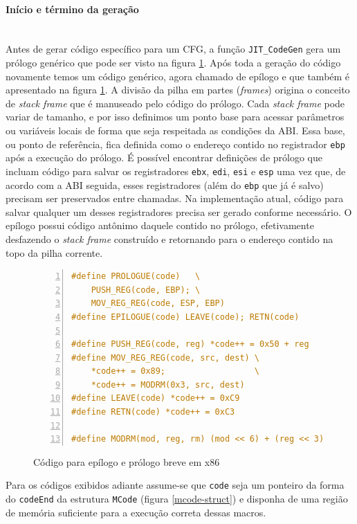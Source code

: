 \paragraph{Início e término da geração}
\quad \\
Antes de gerar código específico para um CFG, a função
\verb!JIT_CodeGen! gera um prólogo genérico que pode ser visto na
figura \ref{prologo-epilogo}. Após toda a geração do código novamente
temos um código genérico, agora chamado de epílogo e que também é
apresentado na figura \ref{prologo-epilogo}. A divisão da pilha em
partes (\textit{frames}) origina o conceito de \textit{stack frame}
que é manuseado pelo código do prólogo. Cada \textit{stack frame} pode
variar de tamanho, e por isso definimos um ponto base para acessar
parâmetros ou variáveis locais de forma que seja respeitada as
condições da ABI. Essa base, ou ponto de referência, fica definida como
o endereço contido no registrador \verb!ebp! após a execução do
prólogo. É possível encontrar definições de prólogo que incluam código
para salvar os registradores \verb!ebx!, \verb!edi!, \verb!esi!
e \verb!esp! uma vez que, de acordo com a ABI seguida, esses
registradores (além do \verb!ebp! que já é salvo) precisam ser
preservados entre chamadas. Na
implementação atual, código para salvar qualquer um desses
registradores precisa ser gerado conforme necessário. O epílogo possui
código antônimo daquele contido no prólogo, efetivamente desfazendo o
\textit{stack frame} construído e retornando para o endereço contido
na topo da pilha corrente.

\begin{figure}[h]
  \centering
  \begin{lstlisting}[language=C, numbers=left]
#define PROLOGUE(code)   \
    PUSH_REG(code, EBP); \
    MOV_REG_REG(code, ESP, EBP)
#define EPILOGUE(code) LEAVE(code); RETN(code)

#define PUSH_REG(code, reg) *code++ = 0x50 + reg
#define MOV_REG_REG(code, src, dest) \
    *code++ = 0x89;                  \
    *code++ = MODRM(0x3, src, dest)
#define LEAVE(code) *code++ = 0xC9
#define RETN(code) *code++ = 0xC3

#define MODRM(mod, reg, rm) (mod << 6) + (reg << 3) + rm
  \end{lstlisting}
  \caption{Código para epílogo e prólogo breve em x86\label{prologo-epilogo}}
\end{figure}

Para os códigos exibidos adiante assume-se que \verb!code! seja um
ponteiro da forma do \verb!codeEnd!
da estrutura \verb!MCode! (figura \ref{mcode-struct}) e disponha de
uma região de memória suficiente para a execução correta dessas macros.

